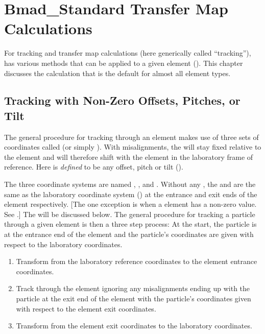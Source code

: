 \chapter{Bmad\_Standard Transfer Map Calculations}
\label{c:bmad.std}

For tracking and transfer map calculations (here generically called
``tracking''), \bmad has various methods that can be applied to a
given element (). This chapter discusses the
 calculation that is the default for almost all
element types.

\section{Tracking with Non-Zero Offsets, Pitches, or Tilt}
\label{s:misalign.track}

The general procedure for tracking through an element makes use of
three sets of coordinates called  (or simply ).  With
misalignments, the  will stay fixed relative
to the element and will therefore shift with the element in the
laboratory frame of reference.  Here  is {\em
defined} to be any offset, pitch or tilt ().

The three coordinate systems are named , , and . Without any , the  and  are the same
as the laboratory coordinate system () at the entrance and
exit ends of the element respectively. [The one exception is when
a  element has a non-zero  value. See
.] The  will be
discussed below. The general procedure for tracking a particle through
a given element is then a three step process: At the start, the
particle is at the entrance end of the element and the particle's
coordinates are given with respect to the laboratory coordinates.
\begin{enumerate}
\item
Transform from the laboratory reference coordinates to the element
entrance coordinates.
\item
Track through the element ignoring any misalignments ending up with
the particle at the exit end of the element with the particle's
coordinates given with respect to the element exit coordinates.
\item
Transform from the element exit coordinates to the laboratory
coordinates.
\end{enumerate}

